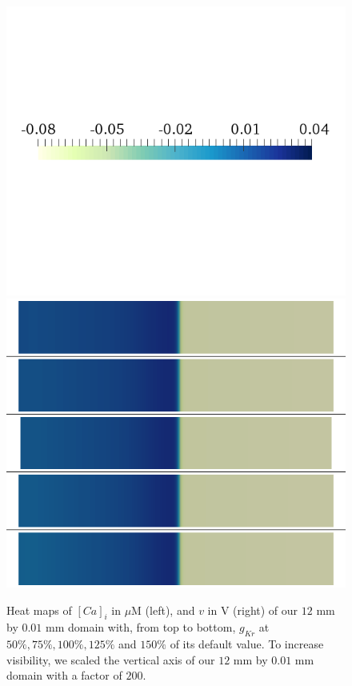 \documentclass{article}
\begin{document}
\begin{figure}
\begin{minipage}{0.5\textwidth}
\includegraphics[trim=0cm 7cm 0cm 6cm, clip=true, width=1\linewidth]{legend_v2}
\includegraphics[trim=0cm 0cm 0cm 0cm, clip=true, width=1\linewidth]{v_gkr}
    \end{minipage}
    \caption{Heat maps of $[Ca]_i$ in $\mu$M (left), and $v$ in V (right) of our $12$ mm by $0.01$ mm domain with, from top to bottom, $g_{Kr}$ at $50\%, 75\%, 100\%, 125\%$ and $150\%$ of its default value. To increase visibility, we scaled the vertical axis of our $12$ mm by $0.01$ mm domain with a factor of $200$.}
    \label{fig:1c}
\end{figure}
\end{document}
